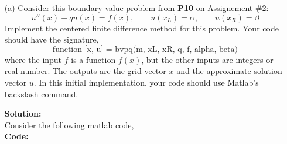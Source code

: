 \documentclass[12pt]{article}
\makeatletter
\theoremstyle{homework}
\newenvironment{exercise}[1]
{\def\@currentlabel{#1}\exercisecore}
{\endexercisecore}
\newcommand{\localhead}[1]{\par\smallskip\noindent\textbf{#1}\nobreak\\}%
\newcommand\solution{\localhead{Solution:}}
\makeatother
\begin{document}
\begin{exercise}{Problem P15} 
  \begin{enumerate}
    \item[(a)] Consider this boundary value problem from \textbf{P10} on Assignement \#2:
    \begin{equation*}
      u''(x) + qu(x) = f(x),\qquad u(x_L) = \alpha,\qquad u(x_R) = \beta
    \end{equation*}
    Implement the centered finite difference method for this problem. Your code should have the signature, 
    \begin{equation*}
      \text{function [x, u] = bvpq(m, xL, xR, q, f, alpha, beta)}
    \end{equation*}
    where the input $f$ is a function $f(x)$, but the other inputs are integers or real number. The outputs 
    are the grid vector $x$ and the approximate solution vector $u$. In this initial implementation, your code 
    should use Matlab's backslash command. 
    \solution Consider the following matlab code, \\
    \textbf{Code:}
    \begin{center}
      
    \end{center}
    




\end{enumerate}
\end{exercise}
\end{document}
